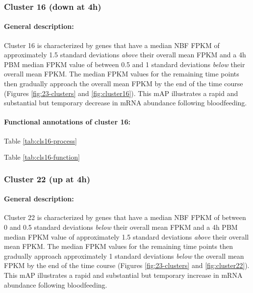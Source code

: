 \subsubsection{Cluster 16 (down at 4h)}

\paragraph*{General description:}

Cluster 16 is characterized by genes that have a median \gls{NBF} \gls{FPKM} of approximately 1.5 standard deviations \textit{above} their overall mean \gls{FPKM} and a 4h \gls{PBM} median \gls{FPKM} value of between 0.5 and 1 standard deviations \textit{below} their overall mean \gls{FPKM}. The median \gls{FPKM} values for the remaining time points then gradually approach the overall mean \gls{FPKM} by the end of the time course (Figures \ref{fig:23-clusters} and \ref{fig:cluster16}).
%
This \gls{mAP} illustrates a rapid and substantial but temporary decrease in mRNA abundance following bloodfeeding.
%



\paragraph*{Functional annotations of cluster 16:}





Table \ref{tab:cls16-process}

Table \ref{tab:cls16-function}
% 

\subsubsection{Cluster 22 (up at 4h)}

\paragraph*{General description:}

Cluster 22 is characterized by genes that have a median \gls{NBF} \gls{FPKM} of between 0 and 0.5 standard deviations \textit{below} their overall mean \gls{FPKM} and a 4h \gls{PBM} median \gls{FPKM} value of approximately 1.5 standard deviations \textit{above} their overall mean \gls{FPKM}. The median \gls{FPKM} values for the remaining time points then gradually approach approximately 1 standard deviations \textit{below} the overall mean \gls{FPKM} by the end of the time course (Figures \ref{fig:23-clusters} and \ref{fig:cluster22}).
%
This \gls{mAP} illustrates a rapid and substantial but temporary increase in mRNA abundance following bloodfeeding.
%



